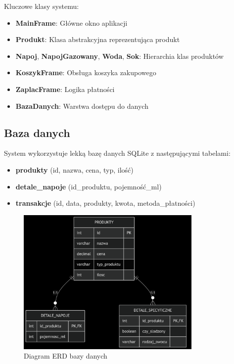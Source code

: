 Kluczowe klasy systemu:
\begin{itemize}
\item \textbf{MainFrame}: Główne okno aplikacji
\item \textbf{Produkt}: Klasa abstrakcyjna reprezentująca produkt
\item \textbf{Napoj}, \textbf{NapojGazowany}, \textbf{Woda}, \textbf{Sok}: Hierarchia klas produktów
\item \textbf{KoszykFrame}: Obsługa koszyka zakupowego
\item \textbf{ZaplacFrame}: Logika płatności
\item \textbf{BazaDanych}: Warstwa dostępu do danych
\end{itemize}


\subsection{Baza danych}
System wykorzystuje lekką bazę danych SQLite z następującymi tabelami:
\begin{itemize}
\item \textbf{produkty} (id, nazwa, cena, typ, ilość)
\item \textbf{detale\_napoje} (id\_produktu, pojemność\_ml)
\item \textbf{transakcje} (id, data, produkty, kwota, metoda\_płatności)
\end{itemize}

\begin{figure}[H]
\centering
\includegraphics[width=0.8\textwidth]{figures/erd_diagram.png}
\caption{Diagram ERD bazy danych}
\label{fig:erd_diagram}
\end{figure}